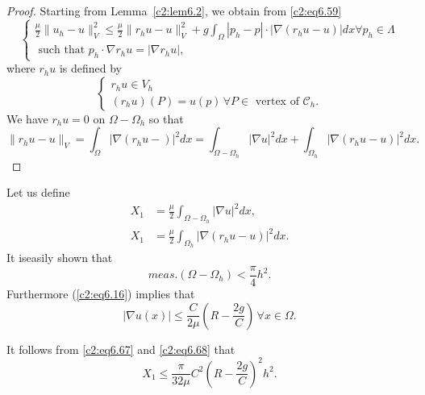 \begin{proof}
Starting from Lemma~\ref{c2:lem6.2}, we obtain from \eqref{c2:eq6.59} 
{\fontsize{10}{12}\selectfont
\begin{equation}
\begin{cases}
\frac{\mu}{2} \parallel  u_h - u \parallel^2_V \leq \frac{\mu}{2} \parallel  r_h u- u \parallel^2_V
+ g \int_\Omega |p_h - p| \cdot | \nabla (r_h u- u) | dx
\forall p_h \in \Lambda \\ 
\text{ such that } p_h \cdot \nabla r_h u= |\nabla r_h
u|,  
\end{cases}
\tag{6.65}\label{c2:eq6.65}
\end{equation}}\relax
where $r_h u$ is defined by 
\begin{equation*}
\begin{cases}
r_h u \in V_h\\
(r_h u) (P) = u(p)\, \forall  P \in \text{ vertex of }
\mathscr{C}_h. 
\end{cases}
\end{equation*}
We have $r_h u= 0$ on $\Omega - \Omega_h$ so that 
\begin{equation}
\parallel r_h u-u\parallel_V = \int_\Omega |\nabla (r_h u -)|^2 dx =
\int_{\Omega - \Omega_h} |\nabla u|^2 dx + \int_{\Omega_h}|
\nabla (r_h u- u) |^2 dx. \tag{6.66}\label{c2:eq6.66} 
\end{equation}
\end{proof}
Let us define 
\begin{align*}
X_1 & = \frac{\mu}{2} \int_{\Omega - \Omega_h} |\nabla u|^2
dx,\\ 
X_1 & = \frac{\mu}{2} \int_{\Omega_h}  |\nabla (r_h u - u) |^2
dx. 
\end{align*}
It is\pageoriginale  easily shown that
\begin{equation}
meas . (\Omega - \Omega_h) < \frac{\pi}{4}
h^2. \tag{6.67}\label{c2:eq6.67}  
\end{equation}
Furthermore (\ref{c2:eq6.16}) implies that 
\begin{equation}
|\nabla u (x)| \leq \frac{C}{2 \mu} \left(R- \frac{2g}{C}\right)\, \forall  x
\in \Omega. \tag{6.68}\label{c2:eq6.68} 
\end{equation}

It follows from \eqref{c2:eq6.67} and \eqref{c2:eq6.68} that  
\begin{equation}
X_1 \leq \frac{\pi}{32 \mu} C^2 \left(R- \frac{2g}{C}\right)^2
h^2.\tag{6.69}\label{c2:eq6.69}   
\end{equation}

